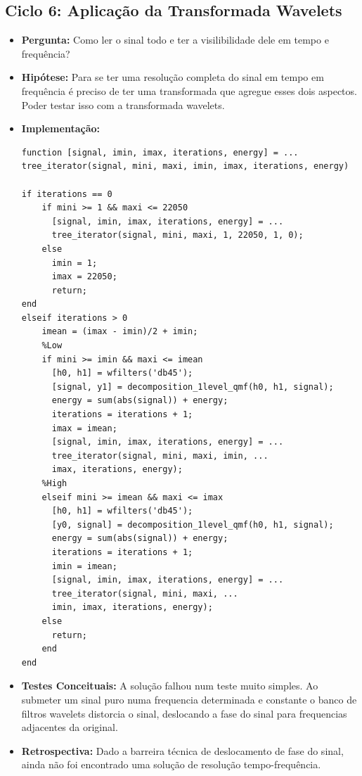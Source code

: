 \subsection{Ciclo 6: Aplicação da Transformada Wavelets}
\label{subsec:ciclo_6}
\begin{itemize}
\item \textbf{Pergunta:} Como ler o sinal todo e ter a visilibilidade dele em tempo e frequência?
\item \textbf{Hipótese:} Para se ter uma resolução completa do sinal em tempo em frequência é preciso de ter uma transformada que agregue esses dois aspectos. Poder testar isso com a transformada wavelets.   
\item \textbf{Implementação:} 
\begin{lstlisting}
function [signal, imin, imax, iterations, energy] = ...
tree_iterator(signal, mini, maxi, imin, imax, iterations, energy)

if iterations == 0
	if mini >= 1 && maxi <= 22050
	  [signal, imin, imax, iterations, energy] = ...
	  tree_iterator(signal, mini, maxi, 1, 22050, 1, 0);
	else
	  imin = 1;
	  imax = 22050;
	  return;
end
elseif iterations > 0
	imean = (imax - imin)/2 + imin;
	%Low
	if mini >= imin && maxi <= imean
	  [h0, h1] = wfilters('db45');
	  [signal, y1] = decomposition_1level_qmf(h0, h1, signal);
	  energy = sum(abs(signal)) + energy;
	  iterations = iterations + 1;
	  imax = imean;
	  [signal, imin, imax, iterations, energy] = ...
	  tree_iterator(signal, mini, maxi, imin, ...
	  imax, iterations, energy);
	%High 
	elseif mini >= imean && maxi <= imax
	  [h0, h1] = wfilters('db45');
	  [y0, signal] = decomposition_1level_qmf(h0, h1, signal);
	  energy = sum(abs(signal)) + energy;
	  iterations = iterations + 1;
	  imin = imean;
	  [signal, imin, imax, iterations, energy] = ...
	  tree_iterator(signal, mini, maxi, ...
	  imin, imax, iterations, energy);
	else
	  return;
	end
end

\end{lstlisting}
\item \textbf{Testes Conceituais:} A solução falhou num teste muito simples. Ao submeter um sinal puro numa frequencia determinada e constante o banco de filtros wavelets distorcia o sinal, deslocando a fase do sinal para frequencias adjacentes da original.
\item \textbf{Retrospectiva:} Dado a barreira técnica de deslocamento de fase do sinal, ainda não foi encontrado uma solução de resolução tempo-frequência.
\end{itemize}

